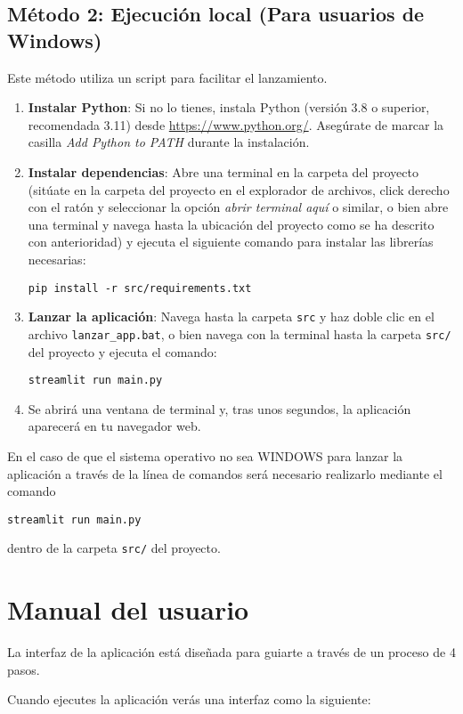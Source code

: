 \subsection{Método 2: Ejecución local (Para usuarios de Windows)}
Este método utiliza un script para facilitar el lanzamiento.
\begin{enumerate}
\item \textbf{Instalar Python}: Si no lo tienes, instala Python (versión 3.8 o superior, recomendada 3.11) desde \url{https://www.python.org/}. Asegúrate de marcar la casilla \textit{Add Python to PATH} durante la instalación.
\item \textbf{Instalar dependencias}: Abre una terminal en la carpeta del proyecto (sitúate en la carpeta del proyecto en el explorador de archivos, click derecho con el ratón y seleccionar la opción \textit{abrir terminal aquí} o similar, o bien abre una terminal y navega hasta la ubicación del proyecto como se ha descrito con anterioridad) y ejecuta el siguiente comando para instalar las librerías necesarias:
\begin{verbatim}
pip install -r src/requirements.txt
\end{verbatim}
\item \textbf{Lanzar la aplicación}: Navega hasta la carpeta \texttt{src} y haz doble clic en el archivo \texttt{lanzar\_app.bat}, o bien navega con la terminal hasta la carpeta \texttt{src/} del proyecto y ejecuta el comando:
\begin{verbatim}
streamlit run main.py
\end{verbatim}
\item Se abrirá una ventana de terminal y, tras unos segundos, la aplicación aparecerá en tu navegador web.
\end{enumerate}


En el caso de que el sistema operativo no sea WINDOWS para lanzar la aplicación a través de la línea de comandos será necesario realizarlo mediante el comando 
\begin{verbatim}
streamlit run main.py
\end{verbatim}
dentro de la carpeta \texttt{src/} del proyecto.

\section{Manual del usuario}
La interfaz de la aplicación está diseñada para guiarte a través de un proceso de 4 pasos.

Cuando ejecutes la aplicación verás una interfaz como la siguiente:

